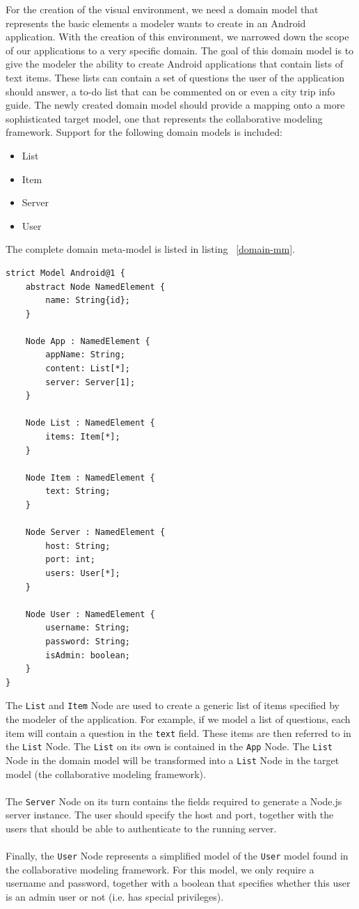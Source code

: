 For the creation of the visual environment, we need a domain model that represents the basic elements a modeler wants to create in an Android application. With the creation of this environment, we narrowed down the scope of our applications to a very specific domain. The goal of this domain model is to give the modeler the ability to create Android applications that contain lists of text items. These lists can contain a set of questions the user of the application should answer, a to-do list that can be commented on or even a city trip info guide. The newly created domain model should provide a mapping onto a more sophisticated target model, one that represents the collaborative modeling framework. Support for the following domain models is included:
\begin{itemize}
\item{List}
\item{Item}
\item{Server}
\item{User}
\end{itemize}
The complete domain meta-model is listed in listing ~\ref{domain-mm}.
\begin{lstlisting}[label=domain-mm,caption=Domain meta-model, captionpos=t]
strict Model Android@1 {
	abstract Node NamedElement {
		name: String{id};
	}

	Node App : NamedElement {
		appName: String;
		content: List[*];
		server: Server[1];
	}

	Node List : NamedElement {
		items: Item[*];
	}

	Node Item : NamedElement {
		text: String;
	}

	Node Server : NamedElement {
		host: String;
		port: int;
		users: User[*];
	}

	Node User : NamedElement {
		username: String;
		password: String;
		isAdmin: boolean;
	}
}
\end{lstlisting}
The \texttt{List} and \texttt{Item} Node are used to create a generic list of items specified by the modeler of the application. For example, if we model a list of questions, each item will contain a question in the \texttt{text} field. These items are then referred to in the \texttt{List} Node. The \texttt{List} on its own is contained in the \texttt{App} Node. The \texttt{List} Node in the domain model will be transformed into a \texttt{List} Node in the target model (the collaborative modeling framework). \\ \\
The \texttt{Server} Node on its turn contains the fields required to generate a Node.js server instance. The user should specify the host and port, together with the users that should be able to authenticate to the running server. \\ \\
Finally, the \texttt{User} Node represents a simplified model of the \texttt{User} model found in the collaborative modeling framework. For this model, we only require a username and password, together with a boolean that specifies whether this user is an admin user or not (i.e. has special privileges).

